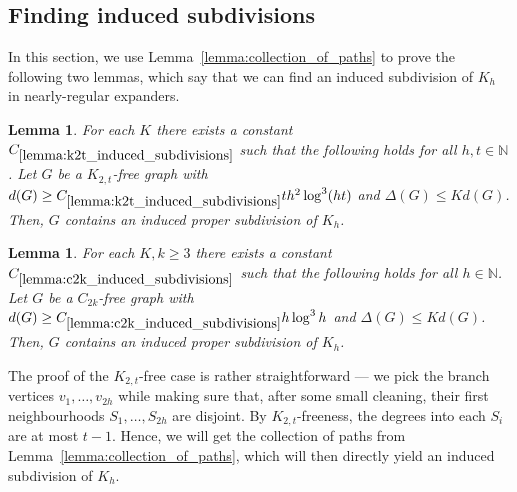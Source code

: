 \documentclass[10pt, a4paper]{article}
\numberwithin{theorem}{section} %
\newtheorem{lemma}[theorem]{Lemma}
\theoremstyle{remark}
\theoremstyle{definition}
\begin{document}
\subsection{Finding induced subdivisions}
In this section, we use Lemma~\ref{lemma:collection_of_paths} to prove the following two lemmas, which say that we can find an induced subdivision of $K_h$ in nearly-regular expanders.
\begin{lemma}\label{lemma:k2t_induced_subdivisions}
    For each $K$ there exists a constant $C_{\ref{lemma:k2t_induced_subdivisions}}$ such that the following holds for all $h, t \in \mathbb{N}$.
    Let $G$ be a $K_{2, t}$-free graph with $d(G) \geq C_{\ref{lemma:k2t_induced_subdivisions}}th^2\log^3(ht)$ and $\Delta(G) \leq Kd(G)$.
    Then, $G$ contains an induced proper subdivision of $K_h$.
\end{lemma}
\begin{lemma}\label{lemma:c2k_induced_subdivisions}
    For each $K, k \geq 3$ there exists a constant $C_{\ref{lemma:c2k_induced_subdivisions}}$ such that the following holds for all $h \in \mathbb{N}$.
    Let $G$ be a $C_{2k}$-free graph with $d(G) \geq C_{\ref{lemma:c2k_induced_subdivisions}}h\log^3h$ and $\Delta(G) \leq Kd(G)$.
    Then, $G$ contains an induced proper subdivision of $K_h$.
\end{lemma}

The proof of the $K_{2,t}$-free case is rather straightforward --- we pick the branch vertices $v_1, \dots, v_{2h}$ while making sure that, after some small cleaning, their first neighbourhoods $S_1, \dots, S_{2h}$ are disjoint.
By $K_{2,t}$-freeness, the degrees into each $S_i$ are at most $t-1$.
Hence, we will get the collection of paths from Lemma~\ref{lemma:collection_of_paths}, which will then directly yield an induced subdivision of $K_h$.
\end{document}
